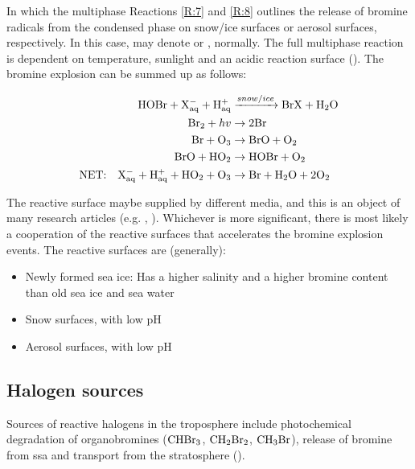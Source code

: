 In which the multiphase Reactions \ref{R:7} and \ref{R:8} outlines the release of bromine radicals from the condensed phase on snow/ice surfaces or aerosol surfaces, respectively. In this case,  may denote  or , normally. The full multiphase reaction is dependent on temperature, sunlight and an acidic reaction surface (\cite{Toyota}). The bromine explosion can be summed up as follows: 

\begin{align*}
    \mathrm{HOBr} + \mathrm{X^-_{aq}} + \mathrm{H^+_{aq}} &\xrightarrow{snow/ice} \mathrm{BrX} + \mathrm{H_2O} \\
    \mathrm{Br_2} + hv &\rightarrow 2\mathrm{Br} \\
    \mathrm{Br} + \mathrm{O_3} &\rightarrow \mathrm{BrO} + \mathrm{O_2} \\
    \mathrm{BrO} + \mathrm{HO_2} &\rightarrow \mathrm{HOBr} + \mathrm{O_2} \\
    \text{NET:} \quad \mathrm{X^-_{aq}} + \mathrm{H^+_{aq}} + \mathrm{HO_2} + \mathrm{O_3}  &\rightarrow \mathrm{Br} + \mathrm{H_2O} + 2\mathrm{O_2} 
\end{align*}

\medskip

The reactive surface maybe supplied by different media, and this is an object of many research articles (e.g.  \cite{Simpson2018}, \cite{Rankin}). Whichever is more significant, there is most likely a cooperation of the reactive surfaces that accelerates the bromine explosion events. The reactive surfaces are (generally): 

\begin{itemize}
    \item Newly formed sea ice: Has a higher salinity and a higher bromine content than old sea ice and sea water \cite{Rankin}
    \item Snow surfaces, with low pH
    \item Aerosol surfaces, with low pH
\end{itemize}




\subsection{Halogen sources}\label{sec:halogen_sources}

Sources of reactive halogens in the troposphere include photochemical degradation of organobromines ($\mathrm{CHBr_3}$, $\mathrm{CH_2Br_2}$, $\mathrm{CH_3Br}$), release of bromine from \acrfull{ssa} and transport from the stratosphere (\cite{Schmidt}). 

